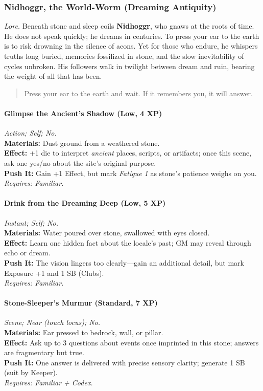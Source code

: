 
\subsubsection{Nidhoggr, the World-Worm (Dreaming Antiquity)}
\textit{Lore.} Beneath stone and sleep coils \textbf{Nidhoggr}, who gnaws at the roots of time. He does not speak quickly; he dreams in centuries. To press your ear to the earth is to risk drowning in the silence of aeons. Yet for those who endure, he whispers truths long buried, memories fossilized in stone, and the slow inevitability of cycles unbroken. His followers walk in twilight between dream and ruin, bearing the weight of all that has been.

\begin{quote}
Press your ear to the earth and wait. If it remembers you, it will answer.
\end{quote}

\paragraph*{Glimpse the Ancient’s Shadow (Low, 4 XP)} \emph{Action; Self; No.}\\
\textbf{Materials:} Dust ground from a weathered stone.\\
\textbf{Effect:} +1 die to interpret \emph{ancient} places, scripts, or artifacts; once this scene, ask one yes/no about the site’s original purpose.\\
\textbf{Push It:} Gain +1 Effect, but mark \emph{Fatigue 1} as stone’s patience weighs on you.\\
\emph{Requires: Familiar.}

\paragraph*{Drink from the Dreaming Deep (Low, 5 XP)} \emph{Instant; Self; No.}\\
\textbf{Materials:} Water poured over stone, swallowed with eyes closed.\\
\textbf{Effect:} Learn one hidden fact about the locale’s past; GM may reveal through echo or dream.\\
\textbf{Push It:} The vision lingers too clearly—gain an additional detail, but mark Exposure +1 and 1 SB (Clubs).\\
\emph{Requires: Familiar.}

\paragraph{Stone-Sleeper’s Murmur (Standard, 7 XP)} \emph{Scene; Near (touch locus); No.}\\
\textbf{Materials:} Ear pressed to bedrock, wall, or pillar.\\
\textbf{Effect:} Ask up to 3 questions about events once imprinted in this stone; answers are fragmentary but true.\\
\textbf{Push It:} One answer is delivered with precise sensory clarity; generate 1 SB (suit by Keeper).\\
\emph{Requires: Familiar + Codex.}

